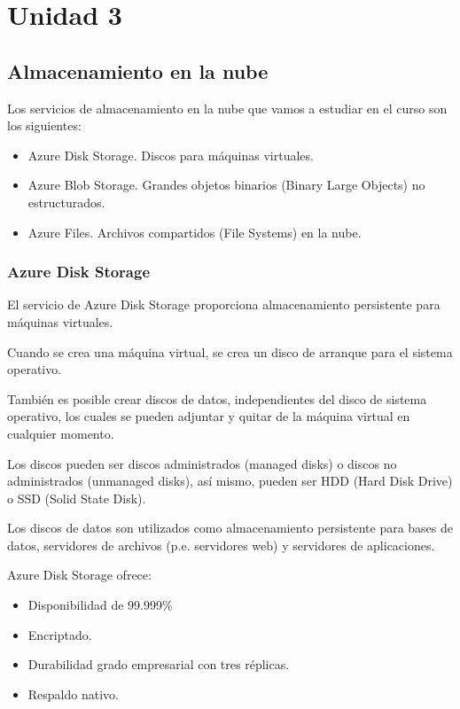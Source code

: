 \part{Unidad 3}


\chapter{Almacenamiento en la nube}

Los servicios de almacenamiento en la nube que vamos a estudiar en el curso son los siguientes:

\begin{itemize}
\item Azure Disk Storage. Discos para máquinas virtuales.
\item Azure Blob Storage. Grandes objetos binarios (Binary Large Objects) no estructurados.
\item Azure Files. Archivos compartidos (File Systems) en la nube.
\end{itemize}

\section{Azure Disk Storage}

El servicio de Azure Disk Storage proporciona almacenamiento persistente para máquinas virtuales.

Cuando se crea una máquina virtual, se crea un disco de arranque para el sistema operativo.

También es posible crear discos de datos, independientes del disco de sistema operativo, los cuales se pueden adjuntar y quitar de la máquina virtual en cualquier momento.

Los discos pueden ser discos administrados (managed disks) o discos no administrados (unmanaged disks), así mismo, pueden ser HDD (Hard Disk Drive) o SSD (Solid State Disk).

Los discos de datos son utilizados como almacenamiento persistente para bases de datos, servidores de archivos (p.e. servidores web) y servidores de aplicaciones.

Azure Disk Storage ofrece:

\begin{itemize}
\item Disponibilidad de 99.999\%
\item Encriptado.
\item Durabilidad grado empresarial con tres réplicas.
\item Respaldo nativo.
\end{itemize}

